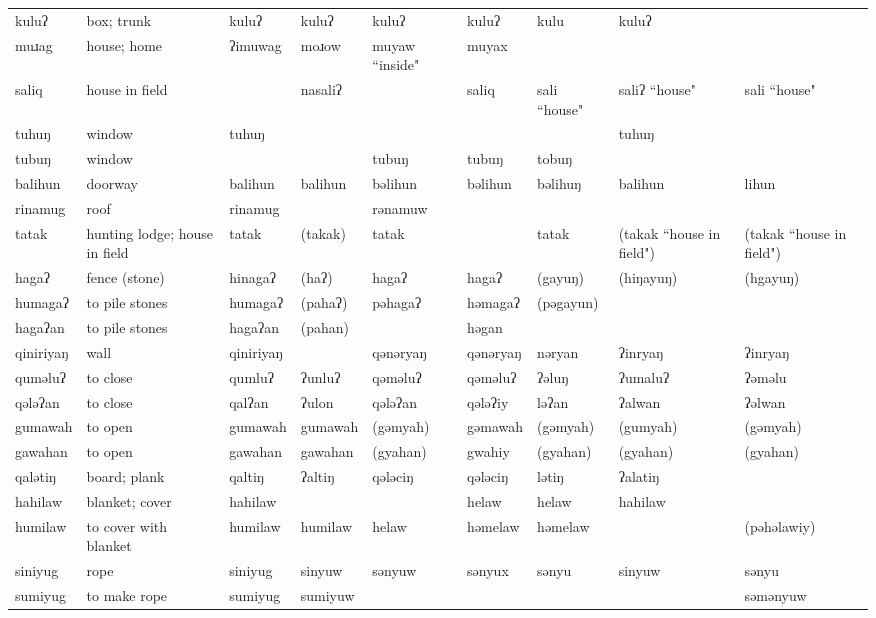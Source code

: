 \begin{landscape}
\begin{longtable}{*{9}{p{}}}
\text{*}kuluʔ & box; trunk & kuluʔ & kuluʔ & kuluʔ & kuluʔ & kulu & kuluʔ & \\
\text{*}muɹag & house; home & ʔimuwag & moɹow & muyaw ``inside" & muyax &  &  & \\
\text{*}saliq & house in field &  & nasaliʔ &  & saliq & sali ``house" & saliʔ ``house" & sali ``house"\\
\text{*}tuhuŋ & window & tuhuŋ &  &  &  &  & tuhuŋ & \\
\text{*}tubuŋ & window &  &  & tubuŋ & tubuŋ & tobuŋ &  & \\
\text{*}balihun & doorway & balihun & balihun & bəlihun & bəlihun & bəlihuŋ & balihun & lihun\\
\text{*}rinamug & roof & rinamug &  & rənamuw &  &  &  & \\
\text{*}tatak & hunting lodge; house in field & tatak & (takak) & tatak &  & tatak & (takak ``house in field") & (takak ``house in field")\\
\text{*}hagaʔ & fence (stone) & hinagaʔ & (haʔ) & hagaʔ & hagaʔ & (gayuŋ) & (hiŋayuŋ) & (hgayuŋ)\\
\text{*}humagaʔ & to pile stones & humagaʔ & (pahaʔ) & pəhagaʔ & həmagaʔ & (pəgayun) &  & \\
\text{*}hagaʔan & to pile stones & hagaʔan & (pahan) &  & həgan &  &  & \\
\text{*}qiniriyaŋ & wall & qiniriyaŋ &  & qənəryaŋ & qənəryaŋ & nəryan & ʔinryaŋ & ʔinryaŋ\\
\text{*}quməluʔ & to close & qumluʔ & ʔunluʔ & qəməluʔ & qəməluʔ & ʔəluŋ & ʔumaluʔ & ʔəməlu\\
\text{*}qələʔan & to close & qalʔan & ʔulon & qələʔan & qələʔiy & ləʔan & ʔalwan & ʔəlwan\\
\text{*}gumawah & to open & gumawah & gumawah & (gəmyah) & gəmawah & (gəmyah) & (gumyah) & (gəmyah)\\
\text{*}gawahan & to open & gawahan & gawahan & (gyahan) & gwahiy & (gyahan) & (gyahan) & (gyahan)\\
\text{*}qalətiŋ & board; plank & qaltiŋ & ʔaltiŋ & qələciŋ & qələciŋ & lətiŋ & ʔalatiŋ & \\
\text{*}hahilaw & blanket; cover & hahilaw &  &  & helaw & helaw & hahilaw & \\
\text{*}humilaw & to cover with blanket & humilaw & humilaw & helaw & həmelaw & həmelaw &  & (pəhəlawiy)\\
\text{*}siniyug & rope & siniyug & sinyuw & sənyuw & sənyux & sənyu & sinyuw & sənyu\\
\text{*}sumiyug & to make rope & sumiyug & sumiyuw &  &  &  &  & səmənyuw\\

\end{longtable}
\end{landscape}
